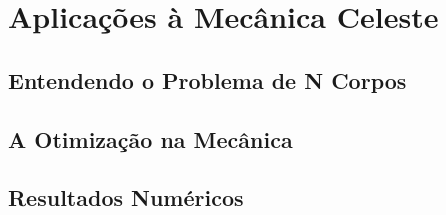 

\chapter{\Large{Aplicações à Mecânica Celeste}} \label{chp:4}


\section{Entendendo o Problema de N Corpos}


\section{{A Otimização na Mecânica}}


\section{Resultados Numéricos}



